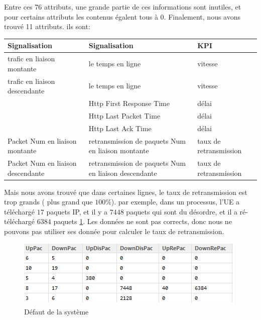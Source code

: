 Entre ces 76 attributs, une grande partie de ces informations sont inutiles, et pour certains attributs les contenus égalent tous à 0. Finalement, nous avons trouvé 11 attributs. ils sont:
\begin{table}[H]
\centering
\begin{tabular}{|>{\centering\arraybackslash}p{3 cm}|>{\centering\arraybackslash}p{3 cm}|>{\centering\arraybackslash}p{3 cm}|}
\hline \rule[-2ex]{0pt}{5.5ex} Signalisation & Signalisation & KPI \\ 
\hline \rule[-2ex]{0pt}{5.5ex} trafic en liaison montante & le temps en ligne & vitesse \\ 
\hline \rule[-2ex]{0pt}{5.5ex} trafic en liaison descendante  & le temps en ligne & vitesse \\ 
\hline \rule[-2ex]{0pt}{5.5ex}  & Http First Response Time & délai \\ 
\hline \rule[-2ex]{0pt}{5.5ex}  & Http Last Packet Time & délai \\ 
\hline \rule[-2ex]{0pt}{5.5ex}  & Http Last Ack Time & délai \\ 
\hline \rule[-2ex]{0pt}{5.5ex}  Packet Num en liaison montante & retransmission de paquets Num en liaison montante & taux de retransmission \\ 
\hline \rule[-2ex]{0pt}{5.5ex}  Packet Num en liaison descendante & retransmission de paquets Num en liaison descendante& taux de retransmission \\ 
\hline 
\end{tabular} 
\end{table}


Mais nous avons trouvé que dans certaines lignes, le taux de retransmission est trop grands ( plus grand que $100\%$). par exemple, dans un processus, l'UE a téléchargé  $17$ paquets IP, et il y a  $7448$  paquets qui sont du désordre, et  il a ré-téléchargé  $6384$ paquets  \ref{fig:défaut}. Les données ne sont pas corrects, donc nous ne pouvons pas utiliser ses donnée pour calculer le taux de retransmission.  
\begin{figure}[H]
	\centering
	\includegraphics[width=0.7\linewidth]{images/11}
	\caption{Défaut de la système}
	\label{fig:défaut}
\end{figure}

